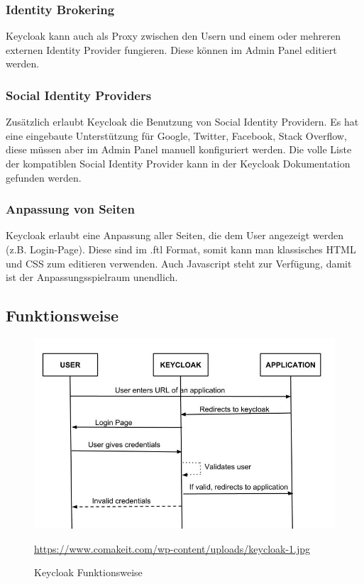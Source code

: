 \subsubsection{Identity Brokering}
Keycloak kann auch als Proxy zwischen den Usern und einem oder mehreren externen Identity Provider fungieren. Diese können im Admin Panel editiert werden. \cite{KeyCloakDZone}
\subsubsection{Social Identity Providers}
Zusätzlich erlaubt Keycloak die Benutzung von Social Identity Providern. Es hat eine eingebaute Unterstützung für Google, Twitter, Facebook, Stack Overflow, diese müssen aber 
im Admin Panel manuell konfiguriert werden. Die volle Liste der kompatiblen Social Identity Provider kann in der Keycloak Dokumentation gefunden werden. \cite{KeyCloakDZone}
\subsubsection{Anpassung von Seiten}
Keycloak erlaubt eine Anpassung aller Seiten, die dem User angezeigt werden (z.B. Login-Page). Diese sind im .ftl Format, somit kann man klassisches HTML und CSS zum editieren verwenden.
Auch Javascript steht zur Verfügung, damit ist der Anpassungsspielraum unendlich. \cite{KeyCloakDZone}
\pagebreak

\subsection{Funktionsweise}
\begin{figure}[htp]
    \centering
    \includegraphics[scale=1.5]{pics/KeycloakFunktionsweise.jpg}
    \caption{Keycloak Funktionsweise}
        \small \url{https://www.comakeit.com/wp-content/uploads/keycloak-1.jpg}
    \label{fig:impl:KeycloakFunc}
\end{figure}


